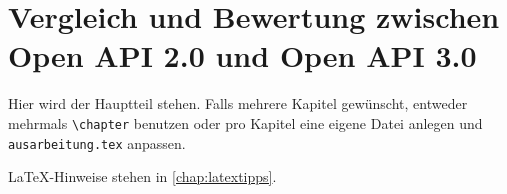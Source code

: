 \chapter{Vergleich und Bewertung zwischen Open API 2.0 und Open API 3.0}
\label{chap:k7}

Hier wird der Hauptteil stehen. Falls mehrere Kapitel gewünscht, entweder mehrmals \texttt{\textbackslash{}chapter} benutzen oder pro Kapitel eine eigene Datei anlegen und \texttt{ausarbeitung.tex} anpassen.

LaTeX-Hinweise stehen in \cref{chap:latextipps}.
